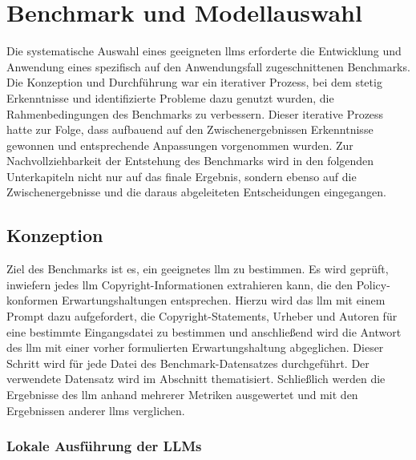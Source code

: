 \chapter{Benchmark und Modellauswahl}\label{ch:benchmark}

Die systematische Auswahl eines geeigneten \glspl{llm} erforderte die Entwicklung und Anwendung eines spezifisch auf den Anwendungsfall zugeschnittenen Benchmarks.
Die Konzeption und Durchführung war ein iterativer Prozess, bei dem stetig Erkenntnisse und identifizierte Probleme dazu genutzt wurden, die Rahmenbedingungen des Benchmarks zu verbessern.
Dieser iterative Prozess hatte zur Folge, dass aufbauend auf den Zwischenergebnissen Erkenntnisse gewonnen und entsprechende Anpassungen vorgenommen wurden.
Zur Nachvollziehbarkeit der Entstehung des Benchmarks wird in den folgenden Unterkapiteln nicht nur auf das finale Ergebnis, sondern ebenso auf die Zwischenergebnisse und die daraus abgeleiteten Entscheidungen eingegangen.


\section{Konzeption}\label{sec:konzeption-benchmark}

Ziel des Benchmarks ist es, ein geeignetes \gls{llm} zu bestimmen.
Es wird geprüft, inwiefern jedes \gls{llm} Copyright-Informationen extrahieren kann, die den Policy-konformen Erwartungshaltungen entsprechen.
Hierzu wird das \gls{llm} mit einem Prompt dazu aufgefordert, die Copyright-Statements, Urheber und Autoren für eine bestimmte Eingangsdatei zu bestimmen und anschließend wird die Antwort des \gls{llm} mit einer vorher formulierten Erwartungshaltung abgeglichen.
Dieser Schritt wird für jede Datei des Benchmark-Datensatzes durchgeführt.
Der verwendete Datensatz wird im Abschnitt  thematisiert.
Schließlich werden die Ergebnisse des \gls{llm} anhand mehrerer Metriken ausgewertet und mit den Ergebnissen anderer \glspl{llm} verglichen.

\subsection{Lokale Ausführung der LLMs}\label{subsec:lokale-ausfuehrung}

